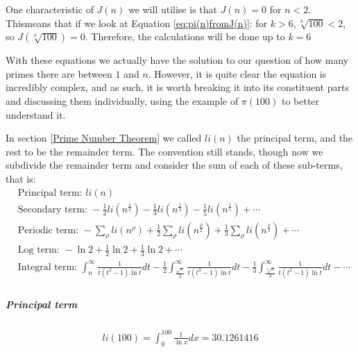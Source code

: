 One characteristic of $J(n)$ we will utilise is that $J(n) = 0$ for $n < 2$. This\footnotemark means that if we look at Equation \ref{eq:pi(n)fromJ(n)}: for $k>6, \sqrt[k]{100} < 2$, so $J(\sqrt[k]{100}) = 0$. Therefore, the calculations will be done up to $k=6$


With these equations we actually have the solution to our question of how many primes there are between $1$ and $n$. However, it is quite clear the equation is incredibly complex, and as such, it is worth breaking it into its constituent parts and discussing them individually, using the example of $\pi(100)$ to better understand it.

In section \ref{Prime Number Theorem} we called $li(n)$ the principal term, and the rest to be the remainder term. The convention still stands, though now we subdivide the remainder term and consider the sum of each of these sub-terms, that is:
\begin{equation*}
\begin{split}
	&\text{Principal term: } li(n) \\
	&\text{Secondary term: } - \frac{1}{2} li(n^{\frac{1}{2}})
		- \frac{1}{3} li(n^{\frac{1}{3}})
		- \frac{1}{5} li(n^{\frac{1}{5}})
		+ \cdots \\
	&\text{Periodic term: } - \sum_{\rho}^{}li(n^{\rho})
		+ \frac{1}{2} \sum_{\rho}li(n^{\frac{\rho}{2}})
		+ \frac{1}{3} \sum_{\rho}li(n^{\frac{\rho}{3}})
		+ \cdots\\
	&\text{Log term: } - \ln 2
		+ \frac{1}{2} \ln 2
		+ \frac{1}{3} \ln 2
		+ \cdots \\
	&\text{Integral term: } \int_{n}^{\infty}\frac{1}{t(t^2-1)\ln t} dt
		- \frac{1}{2} \int_{\frac{\sqrt{n}}{2}}^{\infty}\frac{1}{t(t^2-1)\ln t} dt
		- \frac{1}{3} \int_{\frac{\sqrt[3]{n}}{3}}^{\infty}\frac{1}{t(t^2-1)\ln t} dt
		- \cdots \\
\end{split}
\end{equation*}

\subparagraph{Principal term}
\begin{equation*}
\begin{split}
	li(100) = \int_{0}^{100} \frac{1}{\ln x} dx = 30.1261416
\end{split}
\end{equation*}


